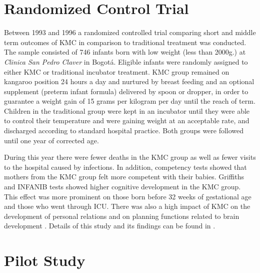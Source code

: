 \section{Randomized Control Trial}

Between 1993 and 1996 a randomized controlled trial comparing short and middle term outcomes of KMC in comparison to traditional treatment was conducted. The sample consisted of 746 infants born with low weight (less than 2000g.) at \emph{Clinica San Pedro Claver} in Bogotá. Eligible infants were randomly assigned to either KMC or traditional incubator treatment. KMC group remained on kangaroo position 24 hours a day and nurtured by breast feeding and an optional supplement (preterm infant formula) delivered by spoon or dropper, in order to guarantee a weight gain of 15 grams per kilogram per day until the reach of term. Children in the traditional group were kept in an incubator until they were able to control their temperature and were gaining weight at an acceptable rate, and discharged according to standard hospital practice. Both groups were followed until one year of corrected age. 

During this year there were fewer deaths in the KMC group as well as fewer visits to the hospital caused by infections. In addition, competency tests showed that mothers from the KMC group felt more competent with their babies. Griffiths and INFANIB tests showed higher cognitive development in the KMC group. This effect was more prominent on those born before 32 weeks of gestational age and those who went through ICU. There was also a high impact of KMC on the development of personal relations and on planning functions related to brain development \autocite{tessier_kangaroo_2003}. Details of this study and its findings can be found in \autocite{charpak_current_1996,charpak_kangaroo_1997,charpak_randomized_2001,charpak_kangaroo_2005}.



\section{Pilot Study}


